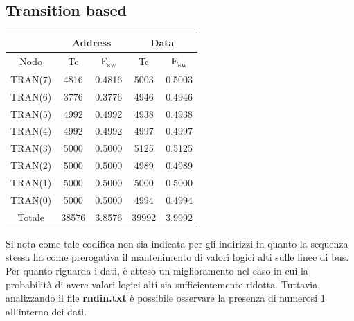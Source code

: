 \documentclass[11pt,  english, makeidx, a4paper, titlepage, oneside]{book}
\begin{document}
\subsection{Transition based}
\begin{center}
	\begin{tabular}{|c|c|c||c|c|}
	\hline
	& \multicolumn{2}{|c||}{Address} & \multicolumn{2}{|c|}{Data}\\
	\hline
	Nodo & Tc & E\textsubscript{sw} & Tc & E\textsubscript{sw} \\
	\hline
	TRAN(7) & 4816 & 0.4816 & 5003 & 0.5003\\
	 \hline
	TRAN(6) & 3776 & 0.3776 & 4946 & 0.4946\\
	\hline
	TRAN(5) & 4992 & 0.4992 & 4938 & 0.4938\\
	\hline
	TRAN(4) & 4992 & 0.4992 & 4997 & 0.4997\\
	\hline
	TRAN(3) & 5000 & 0.5000 & 5125 & 0.5125\\
	\hline
	TRAN(2) & 5000 & 0.5000 & 4989 & 0.4989\\
	\hline
	TRAN(1) & 5000 & 0.5000 & 5000 &0.5000 \\
	\hline
	TRAN(0) & 5000 & 0.5000 & 4994 & 0.4994\\
	\hline
	Totale & 38576 & 3.8576 & 39992 & 3.9992\\
	\hline
	\end{tabular}	
\end{center}
\vspace{0.3cm}
Si nota come tale codifica non sia indicata per gli indirizzi in quanto la sequenza stessa ha come prerogativa il mantenimento di valori logici alti sulle linee di bus.
\\
Per quanto riguarda i dati, è atteso un miglioramento nel caso in cui la probabilità di avere valori logici alti sia sufficientemente ridotta. Tuttavia, analizzando il file \textbf{rndin.txt} è possibile osservare la presenza di numerosi 1 all'interno dei dati.
\end{document}
